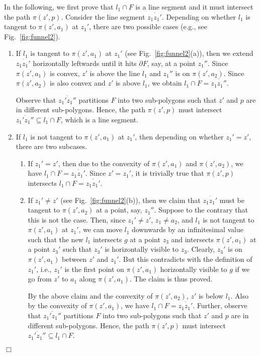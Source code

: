 \documentclass[english,runningheads,11pt]{llncs}
\newenvironment{proof}{\noindent {\textbf{Proof:}}\rm}{\hfill $\Box$\rm}
\begin{document}
\begin{proof}
In the following, we first prove that $l_1\cap F$ is a line segment and it must intersect the path $\pi(z',p)$.
Consider the line segment $\overline{z_1z_1'}$. Depending on whether $l_1$ is tangent
to $\pi(z',a_1)$ at $z_1'$, there are two possible cases (e.g., see Fig.~\ref{fig:funnel2}).

\begin{enumerate}
\item
If $l_1$ is tangent to $\pi(z',a_1)$ at $z_1'$ (see Fig.~\ref{fig:funnel2}(a)), then we extend
$\overline{z_1z_1'}$ horizontally leftwards until it hits $\partial F$, say, at a point $z_1''$. Since $\pi(z',a_1)$ is convex, $z'$ is above the line $l_1$ and $z_1''$ is on $\pi(z',a_2)$. Since $\pi(z',a_2)$ is also convex and $z'$ is above $l_1$, we obtain $l_1\cap F=\overline{z_1z_1''}$.

Observe that $\overline{z_1'z_1''}$ partitions $F$ into two sub-polygons such that $z'$ and
$p$ are in different sub-polygons. Hence, the path $\pi(z',p)$ must intersect
$\overline{z_1'z_1''}\subseteq l_1\cap F$, which is a line segment.

\item
If $l_1$ is not tangent to $\pi(z',a_1)$ at $z_1'$, then depending on whether $z_1'=z'$, there are two subcases.

\begin{enumerate}
\item
If $z_1'=z'$, then due to the convexity of $\pi(z',a_1)$ and $\pi(z',a_2)$, we have $l_1\cap F=\overline{z_1z_1'}$. Since $z'=z_1'$, it is trivially true that $\pi(z',p)$ intersects $l_1\cap F=\overline{z_1z_1'}$.

\item
If $z_1'\not=z'$ (see Fig.~\ref{fig:funnel2}(b)), then we claim that $\overline{z_1z_1'}$ must be tangent to $\pi(z',a_2)$ at a point, say, $z_1''$. Suppose to the contrary that this is not
the case. Then, since $z_1'\neq z'$, $z_1\neq a_2$, and $l_1$ is not tangent to $\pi(z',a_1)$ at $z_1'$, we can move $l_1$ downwards by an infinitesimal value such that the new $l_1$ intersects
$g$ at a point $z_3$ and intersects $\pi(z',a_1)$ at a point $z_3'$ such that $z_3'$ is horizontally visible to $z_3$. Clearly, $z_3'$ is on $\pi(z',a_1)$ between $z'$ and $z_1'$.
But this contradicts with the definition of $z_1'$, i.e., $z_1'$ is the first point on $\pi(z',a_1)$ horizontally visible to $g$ if we go from $z'$ to $a_1$ along $\pi(z',a_1)$. The claim is thus proved.

By the above claim and the convexity of $\pi(z',a_2)$, $z'$ is below $l_1$. Also by the
convexity of $\pi(z',a_1)$, we have $l_1\cap F=\overline{z_1z_1'}$. Further, observe that $\overline{z_1'z_1''}$ partitions $F$ into two sub-polygons such that $z'$ and $p$ are in different sub-polygons. Hence, the path $\pi(z',p)$ must intersect $\overline{z_1'z_1''}\subseteq l_1\cap F$.


\end{enumerate}
\end{enumerate}
\end{proof}
\end{document}
